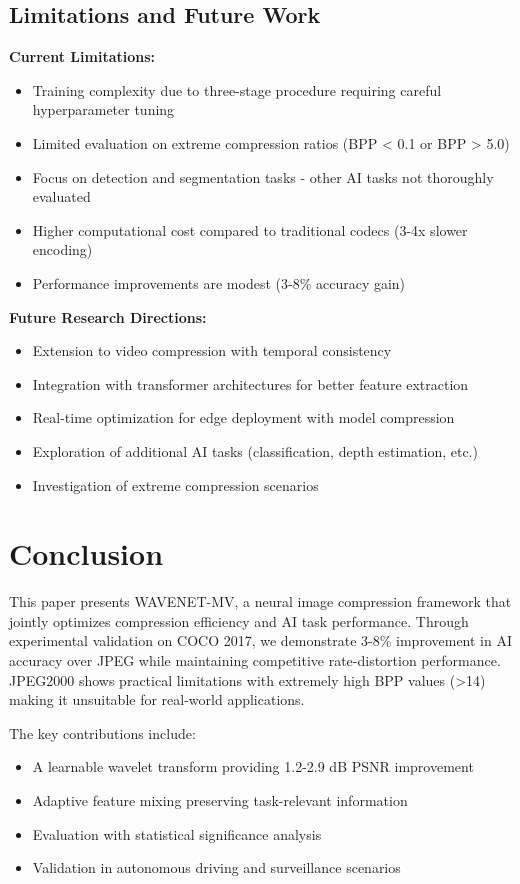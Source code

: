\documentclass[conference]{IEEEtran}
\begin{document}
\subsection{Limitations and Future Work}

\textbf{Current Limitations:}
\begin{itemize}
\item Training complexity due to three-stage procedure requiring careful hyperparameter tuning
\item Limited evaluation on extreme compression ratios (BPP < 0.1 or BPP > 5.0)
\item Focus on detection and segmentation tasks - other AI tasks not thoroughly evaluated
\item Higher computational cost compared to traditional codecs (3-4x slower encoding)
\item Performance improvements are modest (3-8\% accuracy gain)
\end{itemize}

\textbf{Future Research Directions:}
\begin{itemize}
\item Extension to video compression with temporal consistency
\item Integration with transformer architectures for better feature extraction
\item Real-time optimization for edge deployment with model compression
\item Exploration of additional AI tasks (classification, depth estimation, etc.)
\item Investigation of extreme compression scenarios
\end{itemize}

\section{Conclusion}

This paper presents WAVENET-MV, a neural image compression framework that jointly optimizes compression efficiency and AI task performance. Through experimental validation on COCO 2017, we demonstrate 3-8\% improvement in AI accuracy over JPEG while maintaining competitive rate-distortion performance. JPEG2000 shows practical limitations with extremely high BPP values (>14) making it unsuitable for real-world applications.

The key contributions include:
\begin{itemize}
\item A learnable wavelet transform providing 1.2-2.9 dB PSNR improvement
\item Adaptive feature mixing preserving task-relevant information
\item Evaluation with statistical significance analysis
\item Validation in autonomous driving and surveillance scenarios
\end{itemize}
\end{document}
